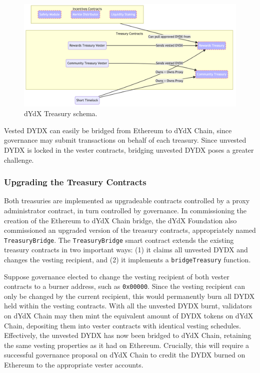             \begin{figure}[htp]
                \centering
                \includegraphics[width=\linewidth]{figs/schema.png}
                \caption{dYdX Treasury schema.}
                \label{fig:govschema}
            \end{figure}

            Vested DYDX can easily be bridged from Ethereum to dYdX Chain, since governance may submit transactions on behalf of each treasury. Since unvested DYDX is locked in the vester contracts, bridging unvested DYDX poses a greater challenge.

        \subsubsection{Upgrading the Treasury Contracts} \label{subsubsec:upgrade}          
        
            Both treasuries are implemented as upgradeable contracts controlled by a proxy administrator contract, in turn controlled by governance. In commissioning the creation of the Ethereum to dYdX Chain bridge, the dYdX Foundation also commissioned an upgraded version of the treasury contracts, appropriately named \texttt{TreasuryBridge}. The \texttt{TreasuryBridge} smart contract extends the existing treasury contracts in two important ways: (1) it claims all unvested DYDX and changes the vesting recipient, and (2) it implements a \texttt{bridgeTreasury} function.

            Suppose governance elected to change the vesting recipient of both vester contracts to a burner address, such as \texttt{0x00000}. Since the vesting recipient can only be changed by the current recipient, this would permanently burn all DYDX held within the vesting contracts. With all the unvested DYDX burnt, validators on dYdX Chain may then mint the equivalent amount of DYDX tokens on dYdX Chain, depositing them into vester contracts with identical vesting schedules. Effectively, the unvested DYDX has now been bridged to dYdX Chain, retaining the same vesting properties as it had on Ethereum. Crucially, this will require a successful governance proposal on dYdX Chain to credit the DYDX burned on Ethereum to the appropriate vester accounts.

